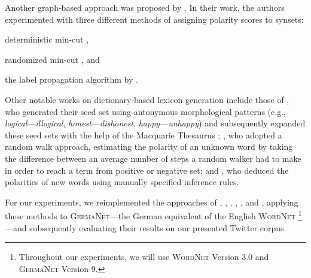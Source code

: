 Another graph-based approach was proposed by \citet{Rao:09}.  In their
work, the authors experimented with three different methods of
assigning polarity scores to synsets:
\begin{inparaenum}
\item deterministic min-cut \cite{Blum:01},
\item randomized min-cut \cite{Blum:04}, and
\item the label propagation algorithm by \citet{Zhu:02}.
\end{inparaenum}
Other notable works on dictionary-based lexicon generation include
those of \citet{Mohammad:09}, who generated their seed set using
antonymous morphological patterns (e.g.,
\emph{logical}---\emph{illogical}, \emph{honest}---\emph{dishonest},
\emph{happy}---\emph{unhappy}) and subsequently expanded these seed
sets with the help of the Macquarie Thesaurus \cite{Bernard:86};
\citet{Awadallah:10}, who adopted a random walk approach, estimating
the polarity of an unknown word by taking the difference between an
average number of steps a random walker had to make in order to reach
a term from positive or negative set; and \citet{Dragut:10}, who
deduced the polarities of new words using manually specified inference
rules.


For our experiments, we reimplemented the approaches of \citet{Hu:04},
\citet{Blair-Goldensohn:08}, \citet{Kim:04,Kim:06}, \citet{Esuli:06c},
\citet{Rao:09}, and \citet{Awadallah:10}, applying these methods to
\textsc{GermaNet}---the German equivalent of the English
\textsc{WordNet} \cite{Hamp:97}\footnote{Throughout our experiments,
  we will use \textsc{WordNet} Version 3.0 and \textsc{GermaNet}
  Version 9.}---and subsequently evaluating their results on our
presented Twitter corpus.

